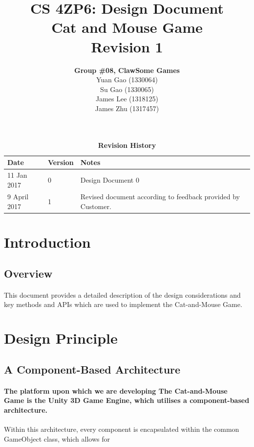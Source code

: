 \documentclass[12pt, titlepage]{article}
\title{CS 4ZP6: Design Document
\\Cat and Mouse Game
\\ Revision 1}
\author{\textbf{Group \#08, ClawSome Games}
		\\ Yuan Gao (1330064)
		\\ Su Gao (1330065)
		\\ James Lee (1318125)
		\\ James Zhu (1317457) 
}
\date{\displaydate{date}}
\begin{document}
\maketitle
{}
\tableofcontents
\listoftables
\listoffigures
\begin{table}[bp]
\caption{\bf Revision History}
\begin{tabularx}{\textwidth}{p{3cm}p{2cm}X}
\toprule {\bf Date} & {\bf Version} & {\bf Notes}\\
\midrule
11 Jan 2017 & 0 & Design Document 0\\
\midrule
9 April 2017 & 1 & Revised document according to feedback provided by Customer.\\
\bottomrule
\end{tabularx}
\end{table}
\newpage


\section{Introduction}

\subsection{Overview}
\paragraph{}This document provides a detailed description of the design considerations and key methods and APIs which are used to implement the Cat-and-Mouse Game.




\section{Design Principle}
\subsection{A Component-Based Architecture}
\paragraph{}\textbf{The platform upon which we are developing The Cat-and-Mouse Game is the Unity 3D Game Engine, which utilises a component-based architecture.}
\paragraph{}Within this architecture, every component is encapsulated within the common GameObject class, which allows for
\end{document}

